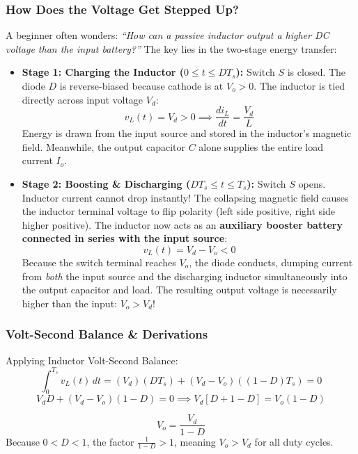 \documentclass[11pt,a4paper]{article}
\renewcommand{\boxed}[1]{#1}
\begin{document}
\subsubsection{How Does the Voltage Get Stepped Up?}
A beginner often wonders: \textit{``How can a passive inductor output a higher DC voltage than the input battery?''}
The key lies in the two-stage energy transfer:
\begin{itemize}[leftmargin=*]
  \item \textbf{Stage 1: Charging the Inductor ($0 \le t \le D T_s$):}
  Switch $S$ is closed. The diode $D$ is reverse-biased because cathode is at $V_o > 0$. The inductor is tied directly across input voltage $V_d$:
  \[
  v_L(t) = V_d > 0 \implies \frac{di_L}{dt} = \frac{V_d}{L}
  \]
  Energy is drawn from the input source and stored in the inductor's magnetic field. Meanwhile, the output capacitor $C$ alone supplies the entire load current $I_o$.
  
  \item \textbf{Stage 2: Boosting \& Discharging ($D T_s \le t \le T_s$):}
  Switch $S$ opens. Inductor current cannot drop instantly! The collapsing magnetic field causes the inductor terminal voltage to flip polarity (left side positive, right side higher positive). 
  The inductor now acts as an \textbf{auxiliary booster battery connected in series with the input source}:
  \[
  v_L(t) = V_d - V_o < 0
  \]
  Because the switch terminal reaches $V_o$, the diode conducts, dumping current from \textit{both} the input source and the discharging inductor simultaneously into the output capacitor and load. The resulting output voltage is necessarily higher than the input: $V_o > V_d$!
\end{itemize}

\subsubsection{Volt-Second Balance \& Derivations}
Applying Inductor Volt-Second Balance:
\[
\int_{0}^{T_s} v_L(t) \, dt = (V_d)(D T_s) + (V_d - V_o)((1 - D) T_s) = 0
\]
\[
V_d D + (V_d - V_o)(1 - D) = 0 \implies V_d [D + 1 - D] = V_o (1 - D)
\]
\begin{formulabox}
\[
\boxed{V_o = \frac{V_d}{1 - D}}
\]
Because $0 < D < 1$, the factor $\frac{1}{1 - D} > 1$, meaning $V_o > V_d$ for all duty cycles.
\end{formulabox}
\end{document}
